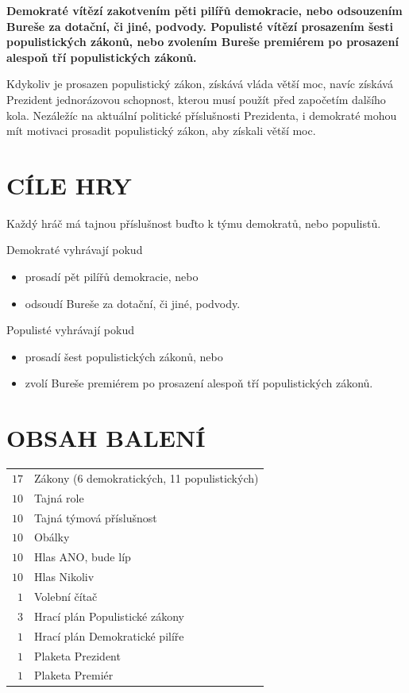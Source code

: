 \documentclass{article}
\begin{document}
    {\bf Demokraté vítězí zakotvením pěti pi\-lí\-řů demokracie, nebo odsouzením Bureše za dotační, či jiné, podvody. Populisté ví\-tě\-zí prosazením šesti populistických zá\-ko\-nů, nebo zvolením Bureše premiérem po prosazení alespoň tří populistických zákonů.}

    Kdykoliv je prosazen populistický zákon, zís\-ká\-vá vláda větší moc, navíc získává Prezident jed\-no\-rá\-zo\-vou schopnost, kterou musí použít před za\-po\-če\-tím dalšího kola. Nezáležíc na aktuální politické pří\-sluš\-nos\-ti Prezidenta, i demokraté mohou mít motivaci prosadit populistický zákon, aby získali větší moc.


    \section*{CÍLE HRY}

    Každý hráč má tajnou příslušnost buďto k týmu demokratů, nebo populistů.

    Demokraté vyhrávají pokud
    \begin{itemize}
        \item prosadí pět pilířů demokracie, nebo
        \item odsoudí Bureše za dotační, či jiné, podvody.
    \end{itemize}
    Populisté vyhrávají pokud
    \begin{itemize}
        \item prosadí šest populistických zákonů, nebo
        \item zvolí Bureše premiérem po prosazení alespoň tří po\-pu\-lis\-tic\-kých zákonů.
    \end{itemize}


    \section*{OBSAH BALENÍ}

    \begin{tabular}{r@{~\ldots~}l} %
    $17$ & Zákony (6 demokratických, 11 po\-pu\-lis\-tic\-kých) \\
    $10$ & Tajná role \\
    $10$ & Tajná týmová příslušnost \\
    $10$ & Obálky \\
    $10$ & Hlas ANO, bude líp \\
    $10$ & Hlas Nikoliv \\
    $1$ & Volební čítač \\
    $3$ & Hrací plán Populistické zákony \\
    $1$ & Hrací plán Demokratické pilíře \\
    $1$ & Plaketa Prezident \\
    $1$ & Plaketa Premiér
    \end{tabular}
\end{document}
